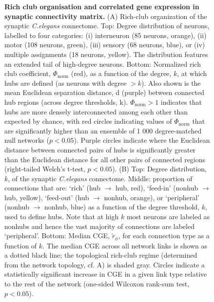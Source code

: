 \begin{figure}[h!]
 \caption{{\bf Rich club organisation and correlated gene expression in synaptic connectivity matrix.}
(A) Rich-club organization of the synaptic \textit{C.elegans} connectome.
Top: Degree distribution of neurons, labelled to four categories: (i) interneuron (85 neurons, orange), (ii) motor (108 neurons, green), (iii) sensory (68 neurons, blue), or (iv) multiple assignments (18 neurons, yellow).
The distribution features an extended tail of high-degree neurons. Bottom: Normalized rich club coefficient, $\Phi_\mathrm{norm}$ (red), as a function of the degree, $k$, at which hubs are defined (as neurons with degree $>k$).
Also shown is the mean Euclidean separation distance, d (purple) between connected hub regions (across degree thresholds, k). $\Phi_\mathrm{norm} > 1$ indicates that hubs are more densely interconnected among each other than expected by chance, with red circles indicating values of $\Phi_\mathrm{norm}$ that are significantly higher than an ensemble of 1 000 degree-matched null networks ($p < 0.05$).
Purple circles indicate where the Euclidean distance between connected pairs of hubs is significantly greater than the Euclidean distance for all other pairs of connected regions (right-tailed Welch's t-test, $p < 0.05$).
(B) Top: Degree distribution, $k$, of the synaptic \textit{C.elegans}  connectome.
Middle: proportion of connections that are: `rich' (hub $\rightarrow$ hub, red), `feed-in' (nonhub $\rightarrow$ hub, yellow), `feed-out' (hub $\rightarrow$ nonhub, orange), or `peripheral' (nonhub $\rightarrow$ nonhub, blue) as a function of the degree threshold, $k$, used to define hubs.
Note that at high $k$ most neurons are labeled as nonhubs and hence the vast majority of connections are labeled `peripheral'.
Bottom: Median CGE, $\tilde{r}_\phi$, for each connection type as a function of $k$.
The median CGE across all network links is shown as a dotted black line; the topological rich-club regime (determined from the network topology, cf. A) is shaded gray.
Circles indicate a statistically significant increase in CGE in a given link type relative to the rest of the network (one-sided Wilcoxon rank-sum test, $p < 0.05$).}

\label{fig:Ch2S1_Fig}
\end{figure}

